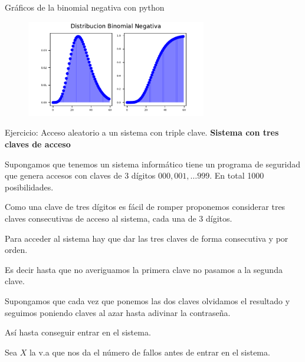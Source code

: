 \documentclass[
  ignorenonframetext,
  aspectratio=169]{beamer}
\begin{document}
\begin{frame}{Gráficos de la binomial negativa con python}
\protect\hypertarget{gruxe1ficos-de-la-binomial-negativa-con-python-2}{}
\begin{figure}

{\centering \includegraphics[width=0.7\textwidth,height=\textheight]{Tema_3_1_Notables_files/figure-beamer/negativa_py_show-1.pdf}

}

\end{figure}
\end{frame}

\begin{frame}{Ejercicio: Acceso aleatorio a un sistema con triple
clave.}
\protect\hypertarget{ejercicio-acceso-aleatorio-a-un-sistema-con-triple-clave.}{}
\textbf{Sistema con tres claves de acceso}

Supongamos que tenemos un sistema informático tiene un programa de
seguridad que genera accesos con claves de 3 dígitos
\(000,001,\ldots 999\). En total 1000 posibilidades.

Como una clave de tres dígitos es fácil de romper proponemos considerar
tres claves consecutivas de acceso al sistema, cada una de 3 dígitos.

Para acceder al sistema hay que dar las tres claves de forma consecutiva
y por orden.

Es decir hasta que no averiguamos la primera clave no pasamos a la
segunda clave.

Supongamos que cada vez que ponemos las dos claves olvidamos el
resultado y seguimos poniendo claves al azar hasta adivinar la
contraseña.

Así hasta conseguir entrar en el sistema.

Sea \(X\) la v.a que nos da el número de fallos antes de entrar en el
sistema.
\end{frame}
\end{document}
